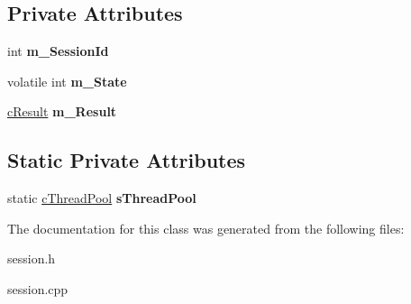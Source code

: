 \subsection*{\-Private \-Attributes}
\begin{DoxyCompactItemize}
\item 
\hypertarget{classengine_1_1cSession_a4adc27ebd913c027b736e9aa2f4142cb}{
int {\bfseries m\-\_\-\-Session\-Id}}
\label{classengine_1_1cSession_a4adc27ebd913c027b736e9aa2f4142cb}

\item 
\hypertarget{classengine_1_1cSession_af0edf0e0ced62ee7e8a5136637cc0084}{
volatile int {\bfseries m\-\_\-\-State}}
\label{classengine_1_1cSession_af0edf0e0ced62ee7e8a5136637cc0084}

\item 
\hypertarget{classengine_1_1cSession_abfc019aab8f8453fd7589266c0e00ef7}{
\hyperlink{classengine_1_1cResult}{c\-Result} {\bfseries m\-\_\-\-Result}}
\label{classengine_1_1cSession_abfc019aab8f8453fd7589266c0e00ef7}

\end{DoxyCompactItemize}
\subsection*{\-Static \-Private \-Attributes}
\begin{DoxyCompactItemize}
\item 
\hypertarget{classengine_1_1cSession_a2f0a00f5302fdf8d88d4738c448ce4fa}{
static \hyperlink{classengine_1_1cThreadPool}{c\-Thread\-Pool} {\bfseries s\-Thread\-Pool}}
\label{classengine_1_1cSession_a2f0a00f5302fdf8d88d4738c448ce4fa}

\end{DoxyCompactItemize}


\-The documentation for this class was generated from the following files\-:\begin{DoxyCompactItemize}
\item 
session.\-h\item 
session.\-cpp\end{DoxyCompactItemize}
